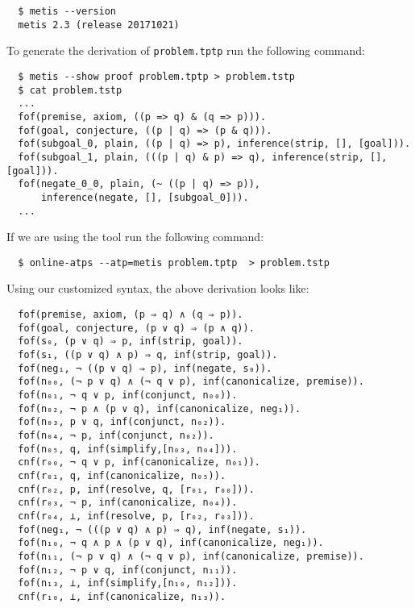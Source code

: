 \documentclass[../main.tex]{subfiles}
\begin{document}
\begin{subappendices}
\begin{verbatim}
  $ metis --version
  metis 2.3 (release 20171021)
\end{verbatim}

To generate the \TSTP derivation of \verb!problem.tptp!
run the following command:

\begin{verbatim}
  $ metis --show proof problem.tptp > problem.tstp
  $ cat problem.tstp
  ...
  fof(premise, axiom, ((p => q) & (q => p))).
  fof(goal, conjecture, ((p | q) => (p & q))).
  fof(subgoal_0, plain, ((p | q) => p), inference(strip, [], [goal])).
  fof(subgoal_1, plain, (((p | q) & p) => q), inference(strip, [], [goal])).
  fof(negate_0_0, plain, (~ ((p | q) => p)),
      inference(negate, [], [subgoal_0])).
  ...
\end{verbatim}

If we are using the  tool run the following command:

\begin{verbatim}
  $ online-atps --atp=metis problem.tptp  > problem.tstp
\end{verbatim}

Using our customized \TSTP syntax, the above \Metis derivation looks like:

\begin{verbatim}
  fof(premise, axiom, (p ⇒ q) ∧ (q ⇒ p)).
  fof(goal, conjecture, (p ∨ q) ⇒ (p ∧ q)).
  fof(s₀, (p ∨ q) ⇒ p, inf(strip, goal)).
  fof(s₁, ((p ∨ q) ∧ p) ⇒ q, inf(strip, goal)).
  fof(neg₁, ¬ ((p ∨ q) ⇒ p), inf(negate, s₀)).
  fof(n₀₀, (¬ p ∨ q) ∧ (¬ q ∨ p), inf(canonicalize, premise)).
  fof(n₀₁, ¬ q ∨ p, inf(conjunct, n₀₀)).
  fof(n₀₂, ¬ p ∧ (p ∨ q), inf(canonicalize, neg₁)).
  fof(n₀₃, p ∨ q, inf(conjunct, n₀₂)).
  fof(n₀₄, ¬ p, inf(conjunct, n₀₂)).
  fof(n₀₅, q, inf(simplify,[n₀₃, n₀₄])).
  cnf(r₀₀, ¬ q ∨ p, inf(canonicalize, n₀₁)).
  cnf(r₀₁, q, inf(canonicalize, n₀₅)).
  cnf(r₀₂, p, inf(resolve, q, [r₀₁, r₀₀])).
  cnf(r₀₃, ¬ p, inf(canonicalize, n₀₄)).
  cnf(r₀₄, ⊥, inf(resolve, p, [r₀₂, r₀₃])).
  fof(neg₁, ¬ (((p ∨ q) ∧ p) ⇒ q), inf(negate, s₁)).
  fof(n₁₀, ¬ q ∧ p ∧ (p ∨ q), inf(canonicalize, neg₁)).
  fof(n₁₁, (¬ p ∨ q) ∧ (¬ q ∨ p), inf(canonicalize, premise)).
  fof(n₁₂, ¬ p ∨ q, inf(conjunct, n₁₁)).
  fof(n₁₃, ⊥, inf(simplify,[n₁₀, n₁₂])).
  cnf(r₁₀, ⊥, inf(canonicalize, n₁₃)).
\end{verbatim}


\end{subappendices}
\end{document}
